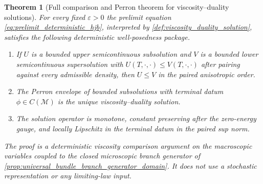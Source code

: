\documentclass[12pt, letterpaper]{amsart}
\newcommand{\Mcal}{\mathcal{M}}
\theoremstyle{plain}
\newtheorem{theorem}{Theorem}[section]
\theoremstyle{definition}
\theoremstyle{remark}
\begin{document}
\begin{theorem}[Full comparison and Perron theorem for viscosity--duality solutions]
\label{thm:viscosity_duality_full_comparison}
For every fixed $\varepsilon>0$ the prelimit equation
\eqref{eq:prelimit_deterministic_hjb}, interpreted by
\cref{def:viscosity_duality_solution}, satisfies the following deterministic
well-posedness package.
\begin{enumerate}[label=\textup{(\alph*)}, wide, labelindent=0pt]
    \item If $U$ is a bounded upper semicontinuous subsolution and $V$ is a
    bounded lower semicontinuous supersolution with
    $U(T,\cdot,\cdot)\le V(T,\cdot,\cdot)$ after pairing against every
    admissible density, then $U\le V$ in the paired anisotropic order.
    \item The Perron envelope of bounded subsolutions with terminal datum
    $\phi\in C(\Mcal)$ is the unique viscosity--duality solution.
    \item The solution operator is monotone, constant preserving after the
    zero-energy gauge, and locally Lipschitz in the terminal datum in the
    paired sup norm.
\end{enumerate}
The proof is a deterministic viscosity comparison argument on the macroscopic
variables coupled to the closed microscopic branch generator of
\cref{prop:universal_bundle_branch_generator_domain}.  It does not use a stochastic representation or any limiting-law input.
\end{theorem}
\end{document}
